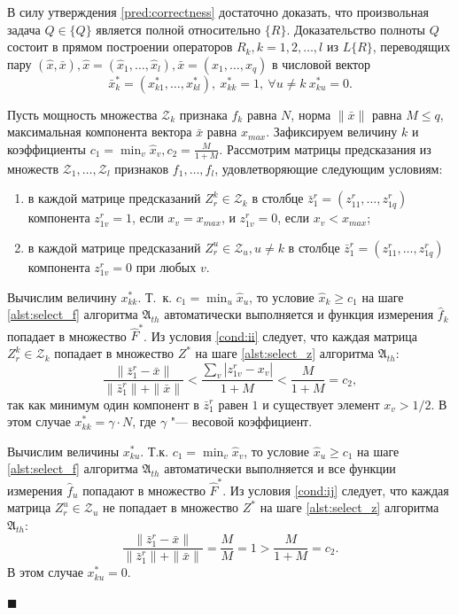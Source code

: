 \documentclass[a4paper, 12pt]{article}
\theoremstyle{plain}
\newenvironment{Proof}%
	{\par\noindent{\bf Доказательство.}}%
	{\hfill$\scriptstyle\blacksquare$}
\begin{document}
	\begin{Proof}
		В силу утверждения \ref{pred:correctness} достаточно доказать, что произвольная задача $Q\in\{Q\}$ является полной относительно $\{R\}$. Доказательство полноты $Q$ состоит в прямом построении операторов $R_k, k=1,2,\dots,l$ из $L\{R\}$, переводящих пару $(\hat{x},\bar{x}), \hat{x}=(\hat{x}_1,\dots,\hat{x}_l), \bar{x}=(x_1,\dots,x_q)$ в числовой вектор
		\begin{equation} \label{crit:fillness}
			\bar{x}_k^*=(x_{k1}^*,\dots,x_{kl}^*),\ x_{kk}^*=1,\ \forall u\neq k\ x_{ku}^*=0.
		\end{equation} 
		
		Пусть мощность множества $\mathcal Z_k$ признака $f_k$ равна $N$, норма $\|\bar x\|$ равна $M{\leqslant}q$, максимальная компонента вектора $\bar{x}$ равна $x_{max}$. Зафиксируем величину $k$ и коэффициенты $c_1=\min_v\hat x_v, c_2=\frac{M}{1+M}$. Рассмотрим матрицы предсказания из множеств $\mathcal{Z}_1,\dots,\mathcal{Z}_l$ признаков $f_1,\dots,f_l$, удовлетворяющие следующим условиям:
		
		 \begin{enumerate}
		 	\item в каждой матрице предсказаний $Z_r^k\in\mathcal Z_k$ в столбце $\bar{z}_1^r=(z_{11}^r,\dots,z_{1q}^r)$ компонента $z_{1v}^r=1$, если $x_v=x_{max}$, и $z_{1v}^r=0$, если $x_v<x_{max}$; \label{cond:ii}
		 	
		 	\item в каждой матрице предсказаний $Z_r^u\in\mathcal Z_u, u\neq k$ в столбце $\bar{z}_1^r=(z_{11}^r,\dots,z_{1q}^r)$ компонента $z_{1v}^r=0$ при любых $v$. \label{cond:ij}
		 \end{enumerate}
		 
		 Вычислим величину $x_{kk}^*$. Т.~к. $c_1=\min_u\hat x_u$, то условие $\hat x_k\geqslant c_1$ на шаге \ref{alst:select_f} алгоритма $\mathfrak A_{th}$ автоматически выполняется и функция измерения $\hat f_k$ попадает в множество $\hat F^*$. Из условия \ref{cond:ii} следует, что каждая матрица $Z_r^k\in\mathcal Z_k$ попадает в множество $Z^*$ на шаге \ref{alst:select_z} алгоритма $\mathfrak A_{th}$:
		 \[
		 	\frac{\|\bar{z}_1^r-\bar{x}\|}{\|\bar{z}_1^r\|+\|\bar{x}\|}<\frac{\sum_v|z_{1v}^r-x_v|}{1+M}<\frac{M}{1+M}=c_2,
		 \]
		 так как минимум один компонент в $\bar{z}_1^r$ равен $1$ и существует элемент $x_v>1/2$. В этом случае $x_{kk}^*=\gamma{\cdot}N$, где $\gamma$ "--- весовой коэффициент.
		 
		 Вычислим величины $x_{ku}^*$. Т.к. $c_1=\min_v\hat x_v$, то условие $\hat x_u\geqslant c_1$ на шаге \ref{alst:select_f} алгоритма $\mathfrak{A}_{th}$ автоматически выполняется и все функции измерения $\hat f_u$ попадают в множество $\hat F^*$. Из условия \ref{cond:ij} следует, что каждая матрица $Z_r^u\in\mathcal Z_u$ не попадает в множество $Z^*$ на шаге \ref{alst:select_z} алгоритма $\mathfrak A_{th}$:
		 \[
		 \frac{\|\bar{z}_1^r-\bar{x}\|}{\|\bar{z}_1^r\|+\|\bar{x}\|}=\frac{M}{M}=1>\frac{M}{1+M}=c_2.
		 \]
		 В этом случае $x_{ku}^*=0$.
		 

\end{Proof}
\end{document}

